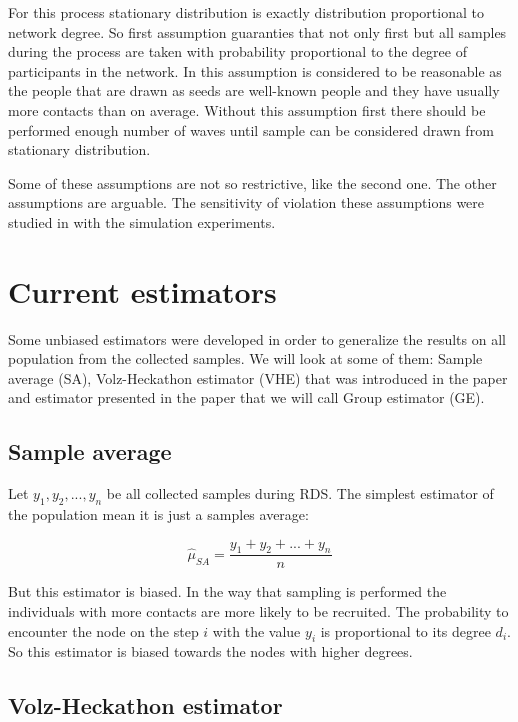 \documentclass[12pt]{report}
\begin{document}
For this process stationary distribution is exactly distribution proportional to network degree. So first assumption guaranties that not only first but all samples during the process are taken with probability proportional to the degree of participants in the network. In \cite{salganik2004sampling} this assumption is considered to be reasonable as the people that are drawn as seeds are well-known people and they have usually more contacts than on average. Without this assumption first there should be performed enough number of waves until sample can be considered drawn from stationary distribution. 

Some of these assumptions are not so restrictive, like the second one. The other assumptions are arguable. The sensitivity of violation these assumptions were studied in \cite{gile2010respondent} with the simulation experiments. 


\section{Current estimators}
\label{sec:Current estimators}

Some unbiased estimators were developed in order to generalize the results on all population from the collected samples. We will look at some of them: Sample average (SA), Volz-Heckathon estimator (VHE) that was introduced in the paper \cite{volz2008probability} and estimator presented in the paper \cite{salganik2004sampling} that we will call Group estimator (GE). 

\subsection{Sample average}

Let $y_1, y_2, ..., y_n$ be all collected samples during RDS. The simplest estimator of the population mean it is just a samples average:

$$ \widehat{\mu}_{SA} = \frac{y_1 + y_2 + ... + y_n}{n}$$

But this estimator is biased. In the way that sampling is performed the individuals with more contacts are more likely to be recruited. The probability to encounter the node on the step $i$ with the value $y_i$ is proportional to its degree $d_i$.
So this estimator is biased towards the nodes with higher degrees.

 
\subsection{Volz-Heckathon estimator}
\end{document}
